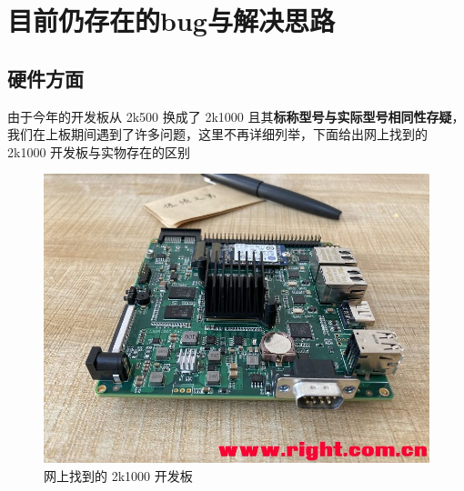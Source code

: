 \chapter{目前仍存在的bug与解决思路}

\section{硬件方面}

由于今年的开发板从 2k500 换成了 2k1000 且其\textbf{标称型号与实际型号相同性存疑}，我们在上板期间遇到了许多问题，这里不再详细列举，下面给出网上找到的 2k1000 开发板与实物存在的区别

\begin{figure}[htbp]
	\centering
	\begin{minipage}{0.49\linewidth}
		\centering
		\includegraphics[width=0.9\linewidth]{figs/2k1000pi.jpg}
		\caption{网上找到的 2k1000 开发板}
		\label{Board-Internet}
	\end{minipage}
	\begin{minipage}{0.49\linewidth}
		\centering

\end{minipage}
\end{figure}

